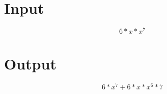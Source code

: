 \documentclass[a4paper, 12pt]{article}
\begin{document}
\Large
\section{Input}

\[6 * x * x ^ 7 \]
\section{Output}

\[6 * x ^ 7 + 6 * x * x ^ 6 * 7 \]
\end{document}

